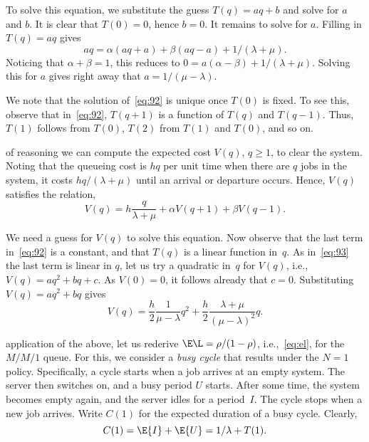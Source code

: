 To solve this equation, we substitute the guess $T(q) = aq+b$ and solve for $a$ and $b$.
It is clear that $T(0)=0$, hence $b=0$.
It remains to solve for $a$. Filling in $T(q)=aq$ gives
\begin{equation*}
  a q = \alpha (aq + a) + \beta (a q - a) + 1/(\lambda+\mu).
\end{equation*}
Noticing that $\alpha + \beta = 1$, this reduces to $0 = a(\alpha - \beta) + 1/(\lambda + \mu)$. Solving this for $a$ gives right away that $a = 1/(\mu-\lambda)$.

We note that the solution of~\cref{eq:92} is unique once $T(0)$ is fixed. To see this, observe that in~\cref{eq:92}, $T(q+1)$ is a function of $T(q)$ and $T(q-1)$. Thus, $T(1)$ follows from $T(0)$, $T(2)$ from $T(1)$ and $T(0)$, and so on.


 of reasoning we can compute the expected cost $V(q)$, $q\geq 1$, to clear the system.
Noting that the queueing cost is $hq$ per unit time when there are $q$ jobs in the system, it costs $hq/(\lambda+\mu)$ until an arrival or departure occurs.
Hence, $V(q)$ satisfies the relation,
\begin{equation}\label{eq:93}
  V(q) = h\frac{q}{\lambda + \mu} + \alpha V(q+1) + \beta V(q-1).
\end{equation}


We need a guess for $V(q)$ to solve this equation.
Now observe that the last term in~\cref{eq:92} is a constant, and that $T(q)$ is a linear function in~$q$.
As in~\cref{eq:93} the last term is linear in $q$,  let us try a quadratic in~$q$ for $V(q)$, i.e., $V(q)=a q^2 + b q + c$.
As $V(0)=0$, it follows already that $c=0$.
Substituting $V(q) = aq^2 + b q$ gives
\begin{equation*}
  V(q) = \frac h 2 \frac 1 {\mu -\lambda} q^2 + \frac h 2 \frac{\lambda + \mu}{(\mu - \lambda)^2}q.
\end{equation*}


 application of the above, let us rederive $\E\L = \rho/(1-\rho)$, i.e.,~\cref{eq:el}, for the $M/M/1$ queue.
For this, we consider a \emph{busy cycle} that results under the $N=1$ policy.
Specifically, a cycle starts when a job arrives at an empty system.
The server then switches on, and a busy period $U$ starts.
After some time,
the system becomes empty again, and the server idles for a period~$I$.
The cycle stops when a new job arrives.
Write $C(1)$ for the expected duration of a busy cycle.
Clearly,
\begin{equation*}
C(1)=\E{I} + \E{U} = 1/\lambda + T(1).
\end{equation*}

